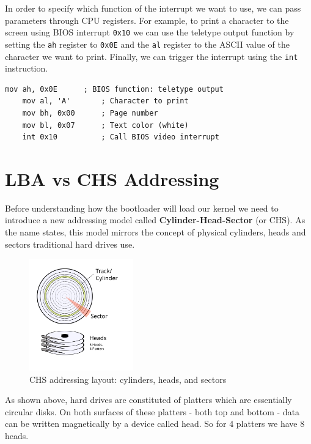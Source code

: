 In order to specify which function of the interrupt we want to use, we can pass parameters through CPU registers.
For example, to print a character to the screen using BIOS interrupt \texttt{0x10} we can use the teletype output function
by setting the \texttt{ah} register to \texttt{0x0E} and the \texttt{al} register to the ASCII value of the character we want
to print. Finally, we can trigger the interrupt using the \texttt{int} instruction.

\begin{lstlisting}[caption={Simple BIOS interrupt call in assembly}]
    mov ah, 0x0E      ; BIOS function: teletype output
    mov al, 'A'       ; Character to print
    mov bh, 0x00      ; Page number
    mov bl, 0x07      ; Text color (white)
    int 0x10          ; Call BIOS video interrupt
\end{lstlisting}


\section{LBA vs CHS Addressing}

Before understanding how the bootloader will load our kernel we need to introduce a new addressing
model called \textbf{Cylinder-Head-Sector} (or CHS). As the name states, this model mirrors the concept of physical 
cylinders, heads and sectors traditional hard drives use. 

\begin{figure}[H]
    \centering
    \includegraphics[width=0.4\textwidth]{images/chs_diagram.png}
    \caption{CHS addressing layout: cylinders, heads, and sectors}
    \label{fig:chs}
\end{figure}

As shown above, hard drives are constituted of platters which are essentially circular disks. On both surfaces
of these platters - both top and bottom - data can be written magnetically by a device called head. So for 
4 platters we have 8 heads. 


